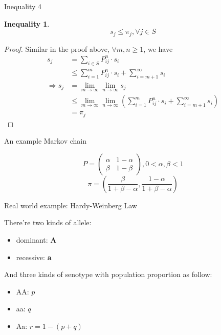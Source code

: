 \documentclass[mathserif]{beamer}
\newtheorem{ineq}{Inequality}
\begin{document}
\begin{frame}{Inequality 4}
	\begin{ineq}
		\[
		s_j \leq \pi_j, \forall j \in S
		\]
	\end{ineq}
\end{frame}

\begin{frame}
	\begin{proof}
		Similar in the proof above, $\forall m,n \geq 1$, we have
		\begin{align*}
			            s_j &= \sum_{i \in S} P^n_{ij} \cdot s_i \\
			                &\leq \sum_{i=1}^m P^n_{ij} \cdot s_i + \sum_{i=m+1}^\infty s_i \\
			\Rightarrow s_j &= \lim_{m \to \infty}\lim_{n \to \infty} s_j \\
			                &\leq \lim_{m \to \infty}\lim_{n \to \infty} \left( 
			                	\sum_{i=1}^m P^n_{ij} \cdot s_i + \sum_{i=m+1}^\infty s_i \right) \\
			                &= \pi_j
		\end{align*}
	\end{proof}
\end{frame}

\begin{frame}{An example Markov chain}
	\begin{example}
		\[
		P = 
		\begin{pmatrix}
			\alpha & 1 - \alpha \\
			\beta  & 1 - \beta
		\end{pmatrix},
		0 < \alpha, \beta < 1
		\]
		\[
		\pi = \left( \frac{\beta}{1+\beta-\alpha}, \frac{1-\alpha}{1+\beta-\alpha} \right) 
		\]
	\end{example}
\end{frame}

\begin{frame}{Real world example: Hardy-Weinberg Law}
	\begin{example}
		There're two kinds of allele: 
		\begin{itemize}
			\item dominant: \textbf{A}
			\item recessive: \textbf{a}
		\end{itemize}
		And three kinds of senotype with population proportion as follow:
		\begin{itemize}
			\item AA: $p$
			\item aa: $q$
			\item Aa: $r = 1 - (p + q)$
		\end{itemize}
	\end{example}
\end{frame}
\end{document}
